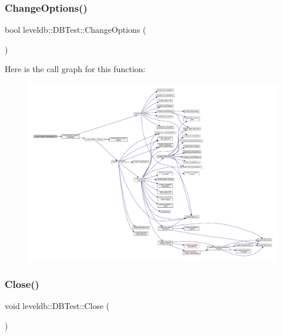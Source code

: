 \subsubsection{\texorpdfstring{ChangeOptions()}{ChangeOptions()}}
{\footnotesize\ttfamily bool leveldb\+::\+D\+B\+Test\+::\+Change\+Options (\begin{DoxyParamCaption}{ }\end{DoxyParamCaption})\hspace{0.3cm}{\ttfamily [inline]}}

Here is the call graph for this function\+:
\nopagebreak
\begin{figure}[H]
\begin{center}
\leavevmode
\includegraphics[width=350pt]{classleveldb_1_1_d_b_test_a587534fe403016f15cf1997ef7a40836_cgraph}
\end{center}
\end{figure}
\mbox{\label{classleveldb_1_1_d_b_test_aee76446bbb9c34cdb1ae00318689aead}} 
\subsubsection{\texorpdfstring{Close()}{Close()}}
{\footnotesize\ttfamily void leveldb\+::\+D\+B\+Test\+::\+Close (\begin{DoxyParamCaption}{ }\end{DoxyParamCaption})\hspace{0.3cm}{\ttfamily [inline]}}

\mbox{\label{classleveldb_1_1_d_b_test_a9b6cd10fd7c8fc54127b0c40c0ac7db5}} 

